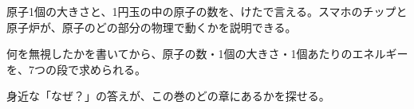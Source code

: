 \begin{furikaeri}
\begin{checklist}
\item 原子1個の大きさと、1円玉の中の原子の数を、けたで言える。スマホのチップと原子炉が、原子のどの部分の物理で動くかを説明できる。
\item 何を無視したかを書いてから、原子の数・1個の大きさ・1個あたりのエネルギーを、7つの段で求められる。
\item 身近な「なぜ？」の答えが、この巻のどの章にあるかを探せる。
\end{checklist}
\end{furikaeri}
